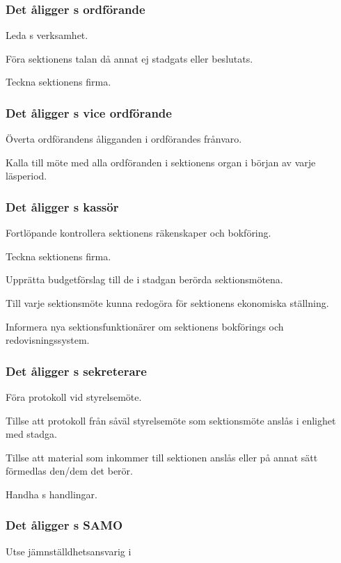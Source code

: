 \subsubsection{Det åligger \STYRIT{}s ordförande}
\begin{att}
	\item Leda \STYRIT{}s verksamhet.
	\item Föra sektionens talan då annat ej stadgats eller beslutats.
	\item Teckna sektionens firma.
\end{att}

\subsubsection{Det åligger \STYRIT{}s vice ordförande}
\begin{att}
	\item Överta ordförandens åligganden i ordförandes frånvaro.
	\item Kalla till möte med alla ordföranden i sektionens organ i början av varje läsperiod.
\end{att}

\subsubsection{Det åligger \STYRIT{}s kassör}
\begin{att}
	\item Fortlöpande kontrollera sektionens räkenskaper och bokföring.
	\item Teckna sektionens firma.
	\item Upprätta budgetförslag till de i stadgan berörda sektionsmötena.
	\item Till varje sektionsmöte kunna redogöra för sektionens ekonomiska ställning.
	\item Informera nya sektionsfunktionärer om sektionens bokförings och redovisningssystem.
\end{att}
 
\subsubsection{Det åligger \STYRIT{}s sekreterare}
\begin{att}
	\item Föra protokoll vid styrelsemöte.
	\item Tillse att protokoll från såväl styrelsemöte som sektionsmöte anslås i enlighet med stadga.
	\item Tillse att material som inkommer till sektionen anslås eller på annat sätt förmedlas den/dem det berör.
	\item Handha \STYRIT{}s handlingar.
\end{att}

\subsubsection{Det åligger \STYRIT{}s SAMO}
\begin{att}
	\item Utse jämnställdhetsansvarig i \STYRIT
\end{att}